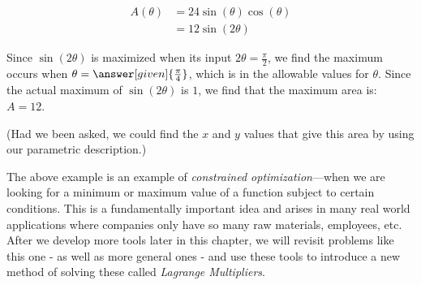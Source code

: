\documentclass{ximera}
\begin{document}
\begin{example}
\begin{align*}
  A(\theta) &= 24 \sin(\theta)\cos(\theta)\\
  &= 12 \sin(2 \theta)
\end{align*}

Since $\sin(2 \theta)$ is maximized when its input $2 \theta = \frac{\pi}{2}$, we find the maximum occurs when $\theta = \answer[given]{\frac{\pi}{4}}$, which is in the allowable values for $\theta$.  Since the actual maximum of  $\sin(2 \theta)$ is $1$, we find that the maximum area is: $A=12$.

(Had we been asked, we could find the $x$ and $y$ values that give
this area by using our parametric description.)
\end{example}

\begin{remark}
The above example is an example of \emph{constrained
  optimization}---when we are looking for a minimum or maximum value
of a function subject to certain conditions.  This is a fundamentally
important idea and arises in many real world applications where
companies only have so many raw materials, employees, etc.  After we
develop more tools later in this chapter, we will revisit problems
like this one - as well as more general ones - and use these tools to
introduce a new method of solving these called \emph{Lagrange
  Multipliers}.
\end{remark}
\end{document}
